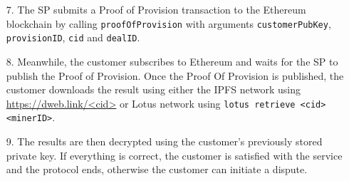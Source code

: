 \documentclass[pdftex,twocolumn,epjc3]{svjour3}
\begin{document}
{\begin{enumerate}
  \item[7.] The SP submits a Proof of Provision transaction to the Ethereum blockchain by calling \texttt{proofOfProvision} with arguments \texttt{customer\-PubKey}, \texttt{provisionID}, \texttt{cid} and \texttt{dealID}.

  \item[8.] Meanwhile, the customer subscribes to Ethereum and waits for the SP to publish the Proof of Provision.
 Once the Proof Of Provision is published, the customer downloads the result using either the IPFS network using \url{https://dweb.link/<cid>} or Lotus network using \texttt{lotus retrieve <cid> <minerID>}. 
 
  \item[9.] The results are then decrypted using the customer's previously stored private key. If everything is correct, the customer is satisfied with the service and the protocol ends, otherwise the customer can initiate a dispute.

\end{enumerate}



}
\end{document}
